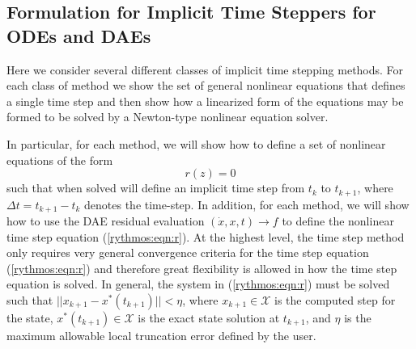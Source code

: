 \documentclass[pdf,ps2pdf,11pt]{SANDreport}
\begin{document}
\subsection{Formulation for Implicit Time Steppers for ODEs and DAEs}
\label{rythmos:sec:implicit-time-steppers}

Here we consider several different classes of implicit time stepping methods.
For each class of method we show the set of general nonlinear equations that
defines a single time step and then show how a linearized form of the
equations may be formed to be solved by a Newton-type nonlinear equation
solver.

In particular, for each method, we will show how to define a set of nonlinear
equations of the form
%
\begin{equation}
r(z) = 0
\label{rythmos:eqn:r}
\end{equation}
%
such that when solved will define an implicit time step from $t_k$ to
$t_{k+1}$, where $\Delta t = t_{k+1} - t_k$ denotes the time-step.  In
addition, for each method, we will show how to use the DAE residual evaluation
$(\dot{x},x,t) {}\rightarrow f$ to define the nonlinear time step equation
(\ref{rythmos:eqn:r}).  At the highest level, the time step method only
requires very general convergence criteria for the time step equation
(\ref{rythmos:eqn:r}) and therefore great flexibility is allowed in how the
time step equation is solved.  In general, the system in (\ref{rythmos:eqn:r})
must be solved such that $||x_{k+1} - x^*(t_{k+1})|| < \eta$, where
$x_{k+1}\in\mathcal{X}$ is the computed step for the state,
$x^*(t_{k+1})\in\mathcal{X}$ is the exact state solution at $t_{k+1}$, and
$\eta$ is the maximum allowable local truncation error defined by the user.
\end{document}
